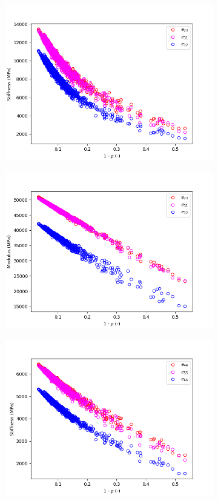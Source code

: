\documentclass[a4paper,fleqn]{DC_ArtStyle}
\begin{document}
\begin{figure}
\begin{subfigure}[b]{0.45\linewidth}
			\includegraphics[width=\linewidth]{LambdaijStiffness_Transverse}
		\end{subfigure}
		\begin{subfigure}[b]{0.45\linewidth}
			\includegraphics[width=\linewidth]{LambdaijModulus_Transverse}
		\end{subfigure}
		\begin{subfigure}[b]{0.45\linewidth}
			\includegraphics[width=\linewidth]{MuijStiffness_Transverse}

\end{subfigure}
\end{figure}
\end{document}
